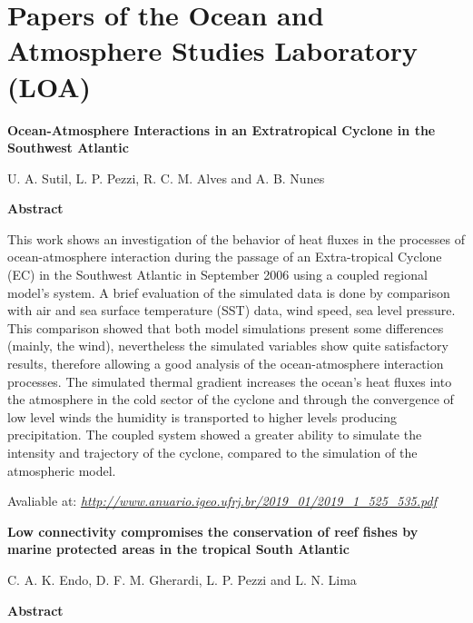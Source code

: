 \chapter{\large{Papers of the Ocean and Atmosphere Studies Laboratory (LOA)}}
\bigskip


\noindent \begin{center}
\textbf{Ocean-Atmosphere Interactions in an Extratropical Cyclone in the Southwest Atlantic}
\bigskip

\noindent U. A. Sutil, L. P. Pezzi, R. C. M. Alves and A. B. Nunes
\bigskip

\noindent \textbf{Abstract}\end{center}
\bigskip

\noindent This work shows an investigation of the behavior of heat fluxes in the processes of ocean-atmosphere interaction
during the passage of an Extra-tropical Cyclone (EC) in the Southwest Atlantic in September 2006 using a coupled
regional model’s system. A brief evaluation of the simulated data is done by comparison with air and sea surface temperature (SST) data, wind speed, sea level pressure. This comparison showed that both model simulations present some
differences (mainly, the wind), nevertheless the simulated variables show quite satisfactory results, therefore allowing a
good analysis of the ocean-atmosphere interaction processes. The simulated thermal gradient increases the ocean’s heat
fluxes into the atmosphere in the cold sector of the cyclone and through the convergence of low level winds the humidity
is transported to higher levels producing precipitation. The coupled system showed a greater ability to simulate the intensity and trajectory of the cyclone, compared to the simulation of the atmospheric model.
\bigskip

\noindent \textcolor{black}{}
\bigskip

\noindent Avaliable at: \textcolor{bleu_cite}{\href{http://www.anuario.igeo.ufrj.br/2019\_01/2019\_1\_525\_535.pdf}{\textit{http://www.anuario.igeo.ufrj.br/2019\_01/2019\_1\_525\_535.pdf}}}
\bigskip

\newpage
\noindent \begin{center}
\textbf{Low connectivity compromises the conservation of reef fishes by marine protected areas in the tropical South Atlantic}
\bigskip

\noindent C. A. K. Endo, D. F. M. Gherardi, L. P. Pezzi and L. N. Lima
\bigskip

\noindent \textbf{Abstract}\end{center}
\bigskip

